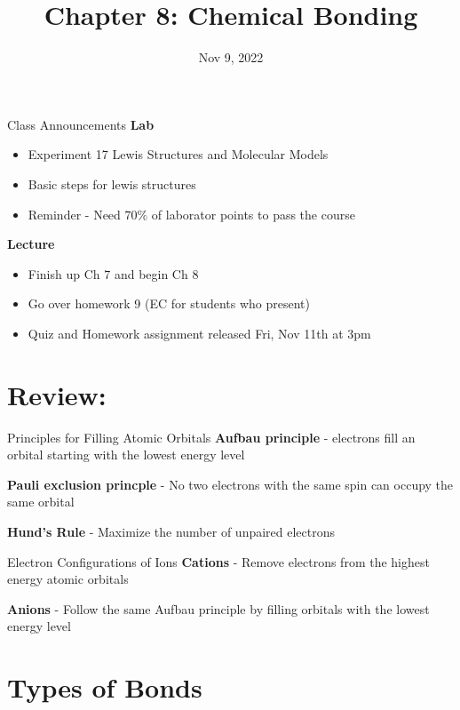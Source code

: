 \documentclass[11pt]{beamer}
\title{Chapter 8: Chemical Bonding}
\institute{Chemistry Department, Cypress College}
\date{Nov 9, 2022}
\begin{document}
\begin{frame}
  \titlepage
\end{frame}

\begin{frame}{Class Announcements}
  \textbf{Lab}
  \begin{itemize}
  \item Experiment 17 Lewis Structures and Molecular Models
  \item Basic steps for lewis structures
  \item Reminder - Need $70\%$ of laborator points to pass
    the course
  \end{itemize}

  \textbf{Lecture}
  \begin{itemize}
  \item Finish up Ch 7 and begin Ch 8
  \item Go over homework 9 (EC for students who present)
  \item Quiz and Homework assignment released Fri, Nov 11th at 3pm
  \end{itemize}
\end{frame}

\section{Review: }

\begin{frame}{Principles for Filling Atomic Orbitals}
  \textbf{Aufbau principle} - electrons fill an orbital starting with
  the lowest energy level

  \textbf{Pauli exclusion princple} - No two electrons with the same
  spin can occupy the same orbital

  \textbf{Hund's Rule} - Maximize the number of unpaired electrons
\end{frame}

\begin{frame}{Electron Configurations of Ions}
  \textbf{Cations} - Remove electrons from the highest energy atomic
  orbitals

  \textbf{Anions} - Follow the same Aufbau principle by filling orbitals
  with the lowest energy level

\end{frame}

\section{Types of Bonds}
\end{document}
